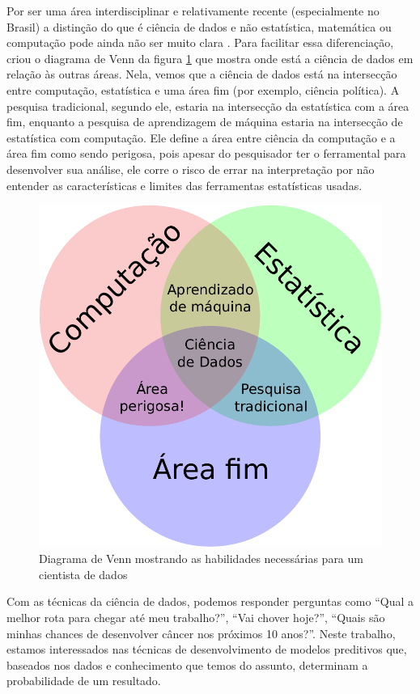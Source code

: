 \documentclass[a4paper,titlepage]{ppgi}\usepackage[]{graphicx}\usepackage[]{color}
\begin{document}
Por ser uma área interdisciplinar e relativamente recente (especialmente no
Brasil) a distinção do que é ciência de dados e não estatística, matemática ou
computação pode ainda não ser muito clara \cite{Porto2014}. Para facilitar essa
diferenciação,  criou o diagrama de Venn da figura
\ref{fig:ciencia-de-dados-venn} que mostra onde está a ciência de dados em
relação às outras áreas. Nela, vemos que a ciência de dados está na intersecção
entre computação, estatística e uma área fim (por exemplo, ciência política). A
pesquisa tradicional, segundo ele, estaria na intersecção da estatística com a
área fim, enquanto a pesquisa de aprendizagem de máquina estaria na intersecção
de estatística com computação. Ele define a área entre ciência da computação e
a área fim como sendo perigosa, pois apesar do pesquisador ter o ferramental
para desenvolver sua análise, ele corre o risco de errar na interpretação por
não entender as características e limites das ferramentas estatísticas usadas.

\begin{figure}[h]
\includegraphics{ciencia-de-dados-diagrama-venn}
\caption{Diagrama de Venn mostrando as habilidades necessárias para um
cientista de dados}
\label{fig:ciencia-de-dados-venn}
\end{figure}

Com as técnicas da ciência de dados, podemos responder perguntas como ``Qual a
melhor rota para chegar até meu trabalho?'', ``Vai chover hoje?'', ``Quais são
minhas chances de desenvolver câncer nos próximos 10 anos?''. Neste trabalho,
estamos interessados nas técnicas de desenvolvimento de modelos preditivos que,
baseados nos dados e conhecimento que temos do assunto, determinam a
probabilidade de um resultado.
\end{document}
